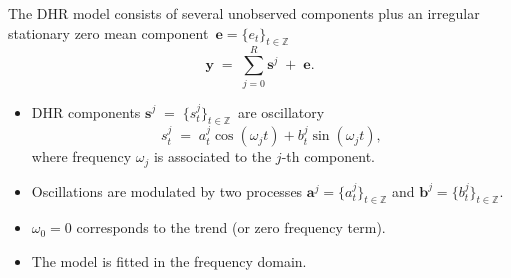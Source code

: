 \begin{slide}

  The {DHR} model consists of several unobserved components plus an
  irregular stationary zero mean component
  $\,{\boldsymbol{e}}=\{e_{t}\}_{t\in\mathbb{Z}}\,$
  \begin{equation}
    \boldsymbol{y}\;=\;\sum_{j=0}^{R}\boldsymbol{s}^{j}\;+\;\boldsymbol{e}.
  \end{equation}
  \begin{itemize}
  \item {DHR} components
    \;$\boldsymbol{s}^{j}\;=\;\{s_{t}^{j}\}_{t\in\mathbb{Z}}\,$\; are
    oscillatory
    \begin{equation}
      s_{t}^{j}\; =\; a_{t}^{j}\cos(\omega_{j}t)+b_{t}^{j}\sin(\omega_{j}t),
    \end{equation}
    where frequency $\omega_{j}$ is associated to the $j$-th component.
  \item Oscillations are modulated by two {\GRW} processes 
    \;$\boldsymbol{a}^{j} = \{a^{j}_t\}_{t\in\mathbb{Z}}$\; and
    \;$\boldsymbol{b}^{j} = \{b^{j}_t\}_{t\in\mathbb{Z}}$.
  \item $\omega_{0}=0$ corresponds to the trend (or zero frequency
    term).
  \item The model is fitted in the frequency domain.
  \end{itemize}
\end{slide}

\begin{slide}
  \begin{center}
  \end{center}
\end{slide}

